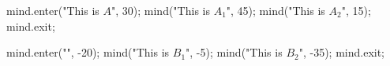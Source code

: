 \usemodule[mindmap]
\startMPpage
mind.enter("This is $A$", 30);
    mind("This is $A_1$", 45);
    mind("This is $A_2$", 15);
mind.exit;

mind.enter("", -20);
    mind("This is $B_1$", -5);
    mind("This is $B_2$", -35);
mind.exit;
\stopMPpage
